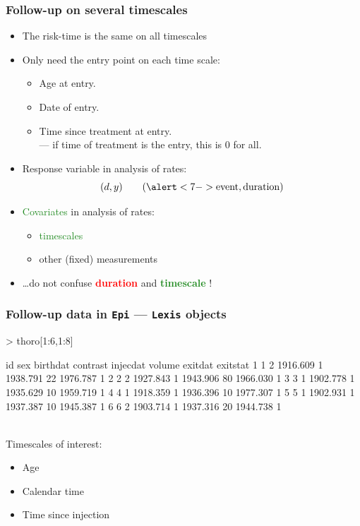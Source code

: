 \begin{frame}[fragile]
  \frametitle{Follow-up on several timescales}
  \begin{itemize}[<+->]
  \item The risk-time is the same on all timescales
  \item Only need the entry point on each time scale:

  \begin{itemize}
    \item Age at entry.
    \item Date of entry.
    \item Time since treatment at entry.\\
          --- if time of treatment is the entry, this is $0$ for all.
  \end{itemize}

  \item \alert<7->{Response variable} in analysis of rates:
\[ (d,y) \qquad (\alert<7->{\text{event}, \text{duration}}) \]

  \item \textcolor{forestgreen}{Covariates} in analysis of rates:

  \begin{itemize}[<+->]
    \item \textcolor{forestgreen}{timescales}
    \item other (fixed) measurements
  \end{itemize}
\item \ldots do not confuse  \textcolor{red}{\textbf{duration}} and   
                     \textcolor{forestgreen}{\textbf{timescale}} !
  \end{itemize}
\end{frame}

\begin{frame}[fragile]
  \frametitle{Follow-up data in \texttt{Epi} --- \texttt{Lexis} objects}
\begin{Schunk}
\begin{Sinput}
> thoro[1:6,1:8]
\end{Sinput}
\begin{Soutput}
  id sex birthdat contrast injecdat volume  exitdat exitstat
1  1   2 1916.609        1 1938.791     22 1976.787        1
2  2   2 1927.843        1 1943.906     80 1966.030        1
3  3   1 1902.778        1 1935.629     10 1959.719        1
4  4   1 1918.359        1 1936.396     10 1977.307        1
5  5   1 1902.931        1 1937.387     10 1945.387        1
6  6   2 1903.714        1 1937.316     20 1944.738        1
\end{Soutput}
\end{Schunk}
\ \\[-1em]\pause
Timescales of interest:
  \begin{itemize}
  \item Age
  \item Calendar time
  \item Time since injection
  \end{itemize}
\end{frame}

